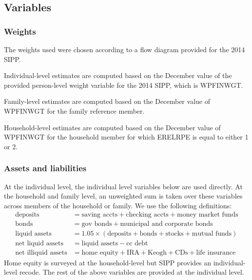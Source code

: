 \documentclass{article}
\begin{document}
\subsection{Variables}

\subsubsection{Weights}
The weights used were chosen according to a flow diagram provided for the 2014 SIPP.

Individual-level estimates are computed based on the December value of the provided person-level weight variable for the 2014 SIPP, which is WPFINWGT.

Family-level estimates are computed based on the December value of WPFINWGT for the family reference member.

Household-level estimates are computed based on the December value of WPFINWGT for the household member for which ERELRPE is equal to either 1 or 2.


\subsubsection{Assets and liabilities}
At the individual level, the individual level variables below are used directly. At the household and family level, an unweighted sum is taken over these variables across members of the household or family.
We use the following definitions:
\begin{align*}
\text{deposits} &= \text{saving accts} + \text{checking accts} + \text{money market funds} \\
\text{bonds} &= \text{gov bonds} + \text{municipal and corporate bonds} \\
\text{liquid assets} &= 1.05 \times (\text{deposits} + \text{bonds} + \text{stocks} + \text{mutual funds}) \\
\text{net liquid assets} &= \text{liquid assets} - \text{cc debt} \\
\text{net illiquid assets} &= \text{home equity} + \text{IRA} + \text{Keogh} + \text{CDs} + \text{life insurance}
\end{align*}
Home equity is surveyed at the household-level but SIPP provides an individual-level recode. The rest of the above variables are provided at the individual level.

\newcommand{\eqindent}{\\ \indent \hspace{4pt} = }
\newcommand{\listassets}[1]{sum(TJS{#1}VAL TJO{#1}VAL TO{#1}VAL)}
\end{document}
